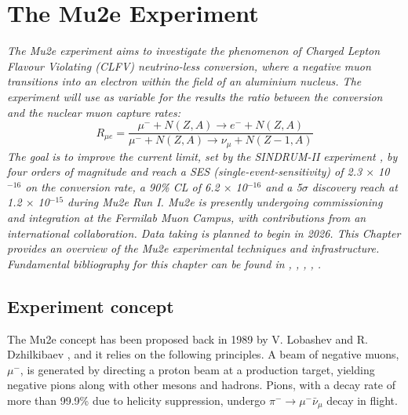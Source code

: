 \chapter{The Mu2e Experiment}\label{mu2echapter}
\textit{
The Mu2e experiment aims to investigate the phenomenon of Charged Lepton Flavour 
Violating (CLFV) neutrino-less conversion, where a negative muon transitions into 
an electron within the field of an aluminium nucleus. The experiment will use as variable for the results 
the ratio between the conversion and the nuclear muon capture rates:
\begin{equation}\label{rmue}
R_{\mu e}=\frac{\mu^{-}+N(Z, A) \rightarrow e^{-}+N(Z, A)}{\mu^{-}+N(Z, A) \rightarrow \nu_\mu+N(Z-1, A)}
\end{equation}
The goal is to improve the current limit, set by the SINDRUM-II experiment \cite{SINDRUMII:2006dvw}, by
four orders of magnitude and reach a SES (single-event-sensitivity) of 2.3 $\times$ 
10$^{-16}$ on the
conversion rate, a 90\% CL of 6.2 $\times$ 10$^{-16}$ and a 5$\sigma$ discovery 
reach at 1.2 $\times$ 10$^{-15}$ during Mu2e Run I.
Mu2e is presently undergoing commissioning and integration at the 
Fermilab Muon Campus, 
with contributions from an international collaboration. Data taking is planned to 
begin in 2026. 
This Chapter provides an overview of the Mu2e experimental techniques and infrastructure. 
Fundamental bibliography for this chapter can be found in \cite{bartoszek2015mu2e}, 
\cite{bobbb}, \cite{Bernstein_2013}, \cite{Kargiantoulakis_2020}, \cite{universe9010054}.}

\section{Experiment concept}
The Mu2e concept has been proposed back in 1989 by V. Lobashev and R. Dzhilkibaev \cite{lobachev}, 
and it relies on the following principles. 
A beam of negative muons, $\mu ^-$, is generated by directing a proton beam at a 
production target, yielding negative pions along with other mesons and hadrons. 
Pions, with a decay rate of more than 99.9\% due to helicity suppression, undergo 
$\pi ^- \rightarrow \mu ^- \bar{\nu}_\mu$ decay in flight. 

